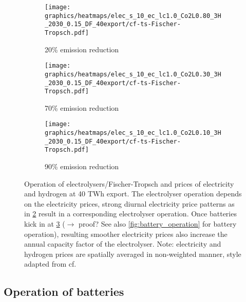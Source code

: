 \begin{figure}
\begin{subfigure}[t]{0.33\textwidth}
    \end{subfigure}


    \begin{subfigure}[t]{0.33\textwidth}
        \centering
        \texttt{[image: graphics/heatmaps/elec\_s\_10\_ec\_lc1.0\_Co2L0.80\_3H\_2030\_0.15\_DF\_40export/cf-ts-Fischer-Tropsch.pdf]}
        \caption{20\% emission reduction}
        \label{fig:operation20}
    \end{subfigure}
    \begin{subfigure}[t]{0.33\textwidth}
        \centering
        \texttt{[image: graphics/heatmaps/elec\_s\_10\_ec\_lc1.0\_Co2L0.30\_3H\_2030\_0.15\_DF\_40export/cf-ts-Fischer-Tropsch.pdf]}
        \caption{70\% emission reduction}
        \label{fig:operation70}
    \end{subfigure}
    \begin{subfigure}[t]{0.33\textwidth}
        \centering
        \texttt{[image: graphics/heatmaps/elec\_s\_10\_ec\_lc1.0\_Co2L0.10\_3H\_2030\_0.15\_DF\_40export/cf-ts-Fischer-Tropsch.pdf]}
        \caption{90\% emission reduction}
        \label{fig:operation90}
    \end{subfigure}

    \caption{Operation of electrolysers/Fischer-Tropsch and prices of electricity and hydrogen at 40 TWh export. The electrolyser operation depends on the electricity prices, strong diurnal electricity price patterns as in \ref{fig:operation70} result in a corresponding electrolyser operation. Once batteries kick in at \ref{fig:operation90} ($\rightarrow$ proof? See also \ref{fig:battery_operation} for battery operation), resulting smoother electricity prices also increase the annual capacity factor of the electrolyser. Note: electricity and hydrogen prices are spatially averaged in non-weighted manner, style adapted from cf. \cite{Neumann2022}}
    \label{fig:ren-cfs}
\end{figure}

\clearpage
\twocolumn


\subsection{Operation of batteries}


